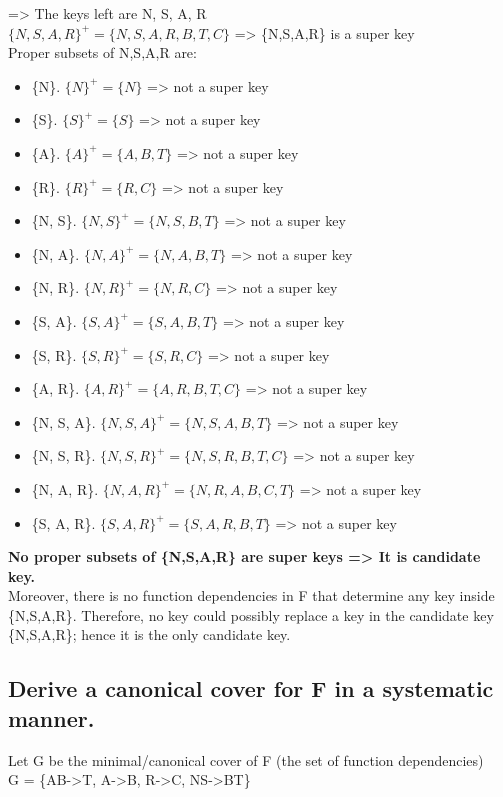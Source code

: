 => The keys left are {N, S, A, R} \\
$\{N,S,A,R\}^{+} = \{N, S, A, R, B, T, C\}$ => \{N,S,A,R\} is a super key \\
Proper subsets of {N,S,A,R} are:
\begin{itemize}
    \item \{N\}. $\{N\}^{+} = \{N\}$ => not a super key
    \item \{S\}. $\{S\}^{+} = \{S\}$ => not a super key
    \item \{A\}. $\{A\}^{+} = \{A, B, T\}$ => not a super key
    \item \{R\}. $\{R\}^{+} = \{R, C\}$ => not a super key
    \item \{N, S\}. $\{N, S\}^{+} = \{ N, S, B, T\}$ => not a super key
    \item \{N, A\}. $\{N, A\}^{+} = \{ N, A, B, T\}$ => not a super key
    \item \{N, R\}. $\{N, R\}^{+} = \{ N, R, C\}$ => not a super key
    \item \{S, A\}. $\{S, A\}^{+} = \{ S, A, B, T\}$ => not a super key
    \item \{S, R\}. $\{S, R\}^{+} = \{ S, R, C\}$ => not a super key
    \item \{A, R\}. $\{A, R\}^{+} = \{ A, R, B, T, C\}$ => not a super key
    \item \{N, S, A\}. $\{N, S, A\}^{+} = \{ N, S, A, B, T\}$ => not a super key
    \item \{N, S, R\}. $\{N, S, R\}^{+} = \{ N, S, R, B, T, C\}$ => not a super key
    \item \{N, A, R\}. $\{N, A, R\}^{+} = \{ N, R, A, B, C, T\}$ => not a super key
    \item \{S, A, R\}. $\{S, A, R\}^{+} = \{ S, A, R, B, T\}$ => not a super key
\end{itemize}

\textbf{No proper subsets of \{N,S,A,R\} are super keys => It is candidate key.}\\
Moreover, there is no function dependencies in F that determine any key inside \{N,S,A,R\}. Therefore, no key could possibly replace a key in the candidate key \{N,S,A,R\}; hence it is the only candidate key.

\newpage
\subsection{Derive a canonical cover for F in a systematic manner.}
Let G be the minimal/canonical cover of F (the set of function dependencies) \\
G = \{AB->T, A->B, R->C, NS->BT\}

